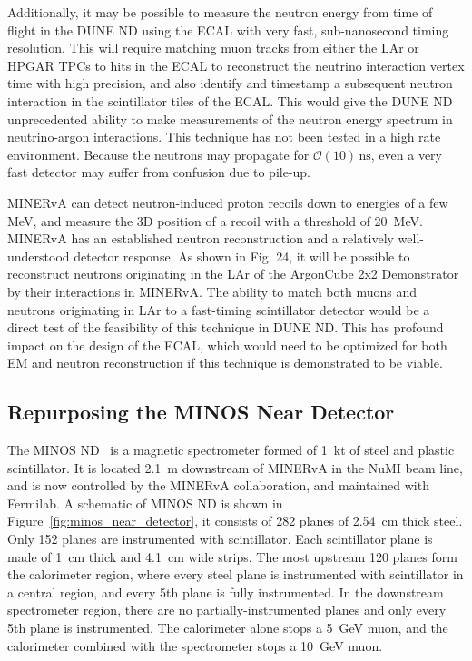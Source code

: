 Additionally, it may be possible to measure the neutron energy from time of flight in the DUNE ND using the ECAL with very fast, sub-nanosecond timing resolution. This will require matching muon tracks from either the LAr or HPGAR TPCs to hits in the ECAL to reconstruct the neutrino interaction vertex time with high precision, and also identify and timestamp a subsequent neutron interaction in the scintillator tiles of the ECAL. This would give the DUNE ND unprecedented ability to make measurements of the neutron energy spectrum in neutrino-argon interactions. This technique has not been tested in a high rate environment. Because the neutrons may propagate for $\mathcal{O}\left(10\right)\,\mathrm{ns}$, even a very fast detector may suffer from confusion due to pile-up.

MINERvA can detect neutron-induced proton recoils down to energies of a few MeV, and measure the 3D position of a recoil with a threshold of 20~MeV.  MINERvA has an established neutron reconstruction and a relatively well-understood detector response.  As shown in Fig. 24, it will be possible to reconstruct neutrons originating in the LAr of the ArgonCube 2x2 Demonstrator by their interactions in MINERvA. The ability to match both muons and neutrons originating in LAr to a fast-timing scintillator detector would be a direct test of the feasibility of this technique in DUNE ND. This has profound impact on the design of the ECAL, which would need to be optimized for both EM and neutron reconstruction if this technique is demonstrated to be viable. 
 
 
\FloatBarrier
\subsection{Repurposing the MINOS Near Detector}
The MINOS ND~\cite{MINOS_NIM} is a magnetic spectrometer formed of \SI{1}{\kilo\tonne} of steel and plastic scintillator. It is located \SI{2.1}{\metre} downstream of MINERvA in the NuMI beam line, and is now controlled by the MINERvA collaboration, and maintained with Fermilab. A schematic of MINOS ND is shown in Figure~\ref{fig:minos_near_detector}, it consists of 282 planes of \SI{2.54}{\centi\metre} thick steel. Only 152 planes are instrumented with scintillator. Each scintillator plane is made of \SI{1}{\centi\metre} thick  and \SI{4.1}{\centi\metre} wide strips. The most upstream 120 planes form the calorimeter region, where every steel plane is instrumented with scintillator in a central region, and every 5th plane is fully instrumented.  In the downstream spectrometer region, there are no partially-instrumented planes and only every 5th plane is instrumented. The calorimeter alone stops a 5~GeV muon, and the calorimeter combined with the spectrometer stops a 10~GeV muon.

